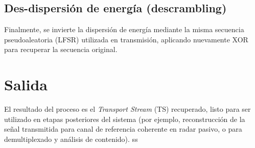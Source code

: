 \subsection{Des-dispersión de energía (descrambling)}
Finalmente, se invierte la dispersión de energía mediante la misma secuencia pseudoaleatoria
(LFSR) utilizada en transmisión, aplicando nuevamente XOR para recuperar la secuencia original.

\section{Salida}
\label{sec:rx_output}

El resultado del proceso es el \textit{Transport Stream} (TS) recuperado, listo para ser utilizado
en etapas posteriores del sistema (por ejemplo, reconstrucción de la señal transmitida para
canal de referencia coherente en radar pasivo, o para demultiplexado y análisis de contenido).
ss
